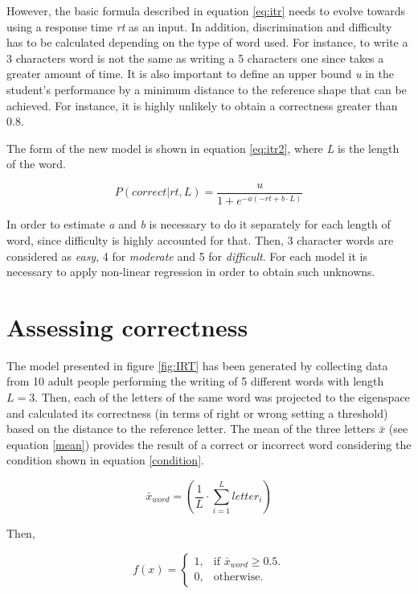 However, the basic formula described in equation \ref{eq:itr} needs to evolve towards using a response time \textit{rt} as an input. In addition, discrimination and difficulty has to be calculated depending on the type of word used. For instance, to write a 3 characters word is not the same as writing a 5 characters one since takes a greater amount of time. It is also important to define an upper bound \textit{u} in the student's performance by a minimum distance to the reference shape that can be achieved. For instance, it is highly unlikely to obtain a correctness greater than 0.8.

The form of the new model is shown in equation \ref{eq:itr2}, where \textit{L} is the length of the word.

\begin{equation}\label{eq:itr2}
P(correct|rt,L) = \frac{u}{1 + e^{-a(-rt+b\cdot L)}}
\end{equation} 

In order to estimate \textit{a} and \textit{b} is necessary to do it separately for each length of word, since difficulty is highly accounted for that. Then, 3 character words are considered as \textit{easy}, 4 for \textit{moderate} and 5 for \textit{difficult}. For each model it is necessary to apply non-linear regression in order to obtain such unknowns. 

\section{Assessing correctness}
The model presented in figure \ref{fig:IRT} has been generated by collecting data from 10 adult people performing the writing of 5 different words with length $ L=3 $. Then, each of the letters of the same word was projected to the eigenspace and calculated its correctness (in terms of right or wrong setting a threshold) based on the distance to the reference letter. The mean of the three letters $ \bar{x} $ (see equation \ref{mean}) provides the result of a correct or incorrect word considering the condition shown in equation \ref{condition}.

\begin{equation}\label{mean}
 \bar{x}_{word} = \left ( \frac{1}{L}\cdot\sum_{i=1}^L{letter_i} \right )
\end{equation}

Then,

\begin{equation}\label{condition}
f(x)=\begin{cases}
 1, & \text{if $\bar{x}_{word} \geq 0.5$}.\\
 0, & \text{otherwise}.
\end{cases}
\end{equation}


